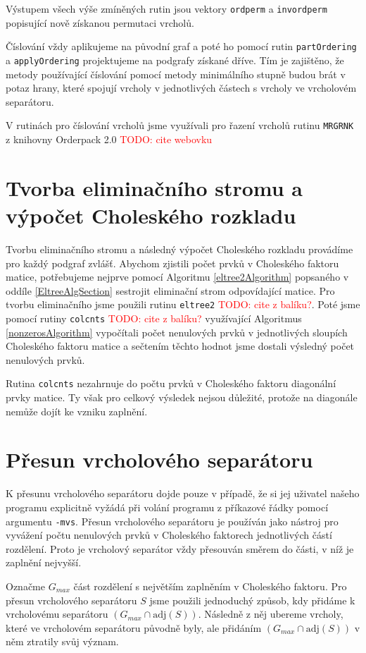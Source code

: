 \documentclass[11pt,american,czech,oneside]{book}
\theoremstyle{plain}
\theoremstyle{definition}
\newcommand{\TODO}[1]{\textcolor{red}{TODO: #1}}
\begin{document}
Výstupem všech výše zmíněných rutin jsou vektory \texttt{ordperm} a \texttt{invordperm} popisující nově získanou permutaci vrcholů.

Číslování vždy aplikujeme na původní graf a poté ho pomocí rutin \texttt{partOrdering} a \texttt{applyOrdering} projektujeme na podgrafy získané dříve. Tím je zajištěno, že metody používající číslování pomocí metody minimálního stupně budou brát v potaz hrany, které spojují vrcholy v jednotlivých částech s vrcholy ve vrcholovém separátoru.

V rutinách pro číslování vrcholů jsme využívali pro řazení vrcholů rutinu \texttt{MRGRNK} z knihovny Orderpack 2.0 \TODO{cite webovku}

\section{Tvorba eliminačního stromu a výpočet Choleského rozkladu}
Tvorbu eliminačního stromu a následný výpočet Choleského rozkladu provádíme pro každý podgraf zvlášť. Abychom zjistili počet prvků v Choleského faktoru matice, potřebujeme nejprve pomocí Algoritmu \ref{eltree2Algorithm} popsaného v oddíle \ref{EltreeAlgSection} sestrojit eliminační strom odpovídající matice. Pro tvorbu eliminačního jsme použili rutinu \texttt{eltree2} \TODO{cite z balíku?}. Poté jsme pomocí rutiny \texttt{colcnts} \TODO{cite z balíku?} využívající Algoritmus \ref{nonzerosAlgorithm} vypočítali počet nenulových prvků v jednotlivých sloupích Choleského faktoru matice a sečtením těchto hodnot jsme dostali výsledný počet nenulových prvků. 

Rutina \texttt{colcnts} nezahrnuje do počtu prvků v Choleského faktoru diagonální prvky matice. Ty však pro celkový výsledek nejsou důležité, protože na diagonále nemůže dojít ke vzniku zaplnění.

\section{Přesun vrcholového separátoru}
K přesunu vrcholového separátoru dojde pouze v případě, že si jej uživatel našeho programu explicitně vyžádá při volání programu z příkazové řádky pomocí argumentu \texttt{-mvs}. Přesun vrcholového separátoru je používán jako nástroj pro vyvážení počtu nenulových prvků v Choleského faktorech jednotlivých částí rozdělení. Proto je vrcholový separátor vždy přesouván směrem do části, v níž je zaplnění nejvyšší.

Označme $G_{max}$ část rozdělení s největším zaplněním v Choleského faktoru. Pro přesun vrcholového separátoru $S$ jsme použili jednoduchý způsob, kdy přidáme k vrcholovému separátoru $(G_{max} \cap\mathrm{adj}(S))$. Následně z něj ubereme vrcholy, které ve vrcholovém separátoru původně byly, ale přidáním $(G_{max} \cap\mathrm{adj}(S))$ v něm ztratily svůj význam.
\end{document}
